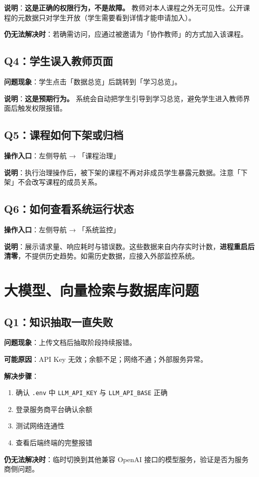 \documentclass[UTF8,a4paper,11pt]{ctexrep}
\begin{document}
\textbf{说明}：\textbf{这是正确的权限行为，不是故障。} 教师对本人课程之外无可见性。公开课程的元数据只对学生开放（学生需要看到详情才能申请加入）。

\textbf{仍无法解决时}：若确需访问，应通过被邀请为「协作教师」的方式加入该课程。


\subsection{Q4：学生误入教师页面}

\textbf{问题现象}：学生点击「数据总览」后跳转到「学习总览」。

\textbf{说明}：\textbf{这是预期行为。} 系统会自动把学生引导到学习总览，避免学生进入教师界面后触发权限报错。


\subsection{Q5：课程如何下架或归档}

\textbf{操作入口}：左侧导航 → 「课程治理」

\textbf{说明}：执行治理操作后，被下架的课程不再对非成员学生暴露元数据。注意「下架」不会改写课程的成员关系。


\subsection{Q6：如何查看系统运行状态}

\textbf{操作入口}：左侧导航 → 「系统监控」

\textbf{说明}：展示请求量、响应耗时与错误数。这些数据来自内存实时计数，\textbf{进程重启后清零}，不提供历史趋势。如需历史数据，应接入外部监控系统。


\section{大模型、向量检索与数据库问题}


\subsection{Q1：知识抽取一直失败}

\textbf{问题现象}：上传文档后抽取阶段持续报错。

\textbf{可能原因}：API Key 无效；余额不足；网络不通；外部服务异常。

\textbf{解决步骤}：

\begin{enumerate}
\item 确认 \texttt{.env} 中 \texttt{LLM\_API\_KEY} 与 \texttt{LLM\_API\_BASE} 正确
\item 登录服务商平台确认余额
\item 测试网络连通性
\item 查看后端终端的完整报错
\end{enumerate}
\textbf{仍无法解决时}：临时切换到其他兼容 OpenAI 接口的模型服务，验证是否为服务商侧问题。
\end{document}
